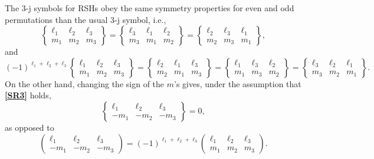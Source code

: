 The 3-j symbols for RSHs obey the same symmetry properties for even and odd permutations than the usual 3-j symbol, i.e.,
\begin{equation}
    \begin{Bmatrix}
        \ell_1 & \ell_2 & \ell_3 \\ m_1 & m_2 & m_3
    \end{Bmatrix}
    =
    \begin{Bmatrix}
        \ell_3 & \ell_1 & \ell_2 \\ m_3 & m_1 & m_2
    \end{Bmatrix}
    =
    \begin{Bmatrix}
        \ell_2 & \ell_3 & \ell_1 \\ m_2 & m_3 & m_1
    \end{Bmatrix}
    ,
\end{equation}
and
\begin{equation}
    (-1)^{\ell_1 + \ell_2 + \ell_3}
    \begin{Bmatrix}
        \ell_1 & \ell_2 & \ell_3 \\ m_1 & m_2 & m_3
    \end{Bmatrix}
    =
    \begin{Bmatrix}
        \ell_2 & \ell_1 & \ell_3 \\ m_2 & m_1 & m_3
    \end{Bmatrix}
    =
    \begin{Bmatrix}
        \ell_1 & \ell_3 & \ell_2 \\ m_1 & m_3 & m_2
    \end{Bmatrix}
    =
    \begin{Bmatrix}
        \ell_3 & \ell_2 & \ell_1 \\ m_3 & m_2 & m_1
    \end{Bmatrix}
    .
\end{equation}
On the other hand, changing the sign of the $m$'s gives, under the assumption that \hyperlink{SR3}{\textbf{[SR3]}} holds,
\begin{equation}
    \begin{Bmatrix}
        \ell_1 & \ell_2 & \ell_3 \\ -m_1 & -m_2 & -m_3
    \end{Bmatrix}
    =
    0,
\end{equation}
as opposed to
\begin{equation}
    \begin{pmatrix}
        \ell_1 & \ell_2 & \ell_3 \\ -m_1 & -m_2 & -m_3
    \end{pmatrix}
    =
    (-1)^{\ell_1 + \ell_2 + \ell_3}
    \begin{pmatrix}
        \ell_1 & \ell_2 & \ell_3 \\ m_1 & m_2 & m_3
    \end{pmatrix}
    .
\end{equation}

